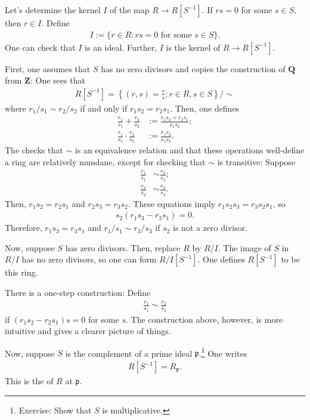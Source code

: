\documentclass [11 pt, oneside, margin = 1 in] {article}
\begin{document}
Let's determine the kernel $I$ of the map $R\longrightarrow R[S^{-1}]$. If $rs=0$ for some $s\in S$, then $r\in I$. Define
\begin{align*}
	I := \{r\in R: rs=0\textrm{ for some $s\in S$}\}.
\end{align*}
One can check that $I$ is an ideal. Further, $I$ is the kernel of $R\longrightarrow R[S^{-1}]$.

First, one assumes that $S$ has no zero divisors and copies the construction of $\mathbf{Q}$ from $\mathbf{Z}$: One sees that
\begin{align*}
	R[S^{-1}] = \left\{ (r,s) =  \frac{r}{s} : r\in R, s\in S \right\}/\sim 
\end{align*}
where $r_1/s_1 \sim r_2/s_2$ if and only if $r_1s_2 = r_2s_1$. Then, one defines 
\begin{align*}
	\frac{r_1}{s_1}+\frac{r_2}{s_2} &:= \frac{r_1s_2+r_2s_1}{s_1s_2};\\
	\frac{r_1}{s_1}\cdot\frac{r_2}{s_2}&:= \frac{r_1r_2}{s_1s_2}.
\end{align*}
The checks that $\sim$ is an equivalence relation and that these operations well-define a ring are relatively mundane, except for checking that $\sim$ is transitive: Suppose 
\begin{align*}
	\frac{r_1}{s_1}&\sim \frac{r_2}{s_2};\\
	\frac{r_2}{s_2}&\sim \frac{r_3}{s_3}.
\end{align*}
Then, $r_1s_2=r_2s_1$ and $r_2s_3=r_3s_2$. These equations imply $r_1s_2s_3=r_3s_2s_1$, so
\begin{align*}
	s_2(r_1s_3-r_3s_1)=0.
\end{align*}
Therefore, $r_1s_3=r_3s_1$ and $r_1/s_1\sim r_3/s_3$ if $s_2$ is not a zero divisor.

Now, suppose $S$ has zero divisors. Then, replace $R$ by $R/I$. The image of $S$ in $R/I$ has no zero divisors, so one can form $R/I[S^{-1}]$. One defines $R[S^{-1}]$ to be this ring. 

There is a one-step construction: Define
\begin{align*}
\frac{r_1}{s_1}\sim \frac{r_2}{s_2}	
\end{align*}
if $(r_1s_2-r_2s_1)s=0$ for some $s$. The construction above, however, is more intuitive and gives a clearer picture of things.

Now, suppose $S$ is the complement of a prime ideal $\mathfrak{p}$.\footnote{Exercise: Show that $S$ is multiplicative.} One writes
\begin{align*}
	R[S^{-1}] = R_{\mathfrak{p}}.
\end{align*}
This is the  of $R$ at $\mathfrak{p}$.
\end{document}
